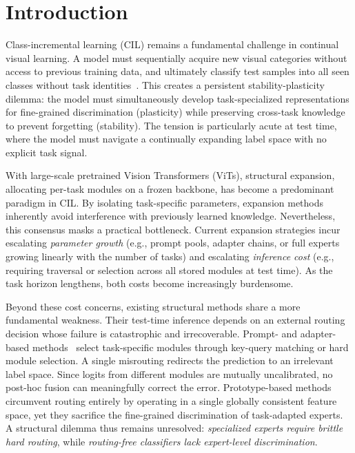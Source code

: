 \section{Introduction}
\label{sec:intro}

Class-incremental learning (CIL) remains a fundamental challenge in continual visual learning. A model must sequentially acquire new visual categories without access to previous training data, and ultimately classify test samples into all seen classes without task identities~\cite{rebuffi2017icarl,van2019three}. This creates a persistent stability-plasticity dilemma: the model must simultaneously develop task-specialized representations for fine-grained discrimination (plasticity) while preserving cross-task knowledge to prevent forgetting (stability). The tension is particularly acute at test time, where the model must navigate a continually expanding label space with no explicit task signal.

With large-scale pretrained Vision Transformers (ViTs), structural expansion, allocating per-task modules on a frozen backbone, has become a predominant paradigm in CIL. By isolating task-specific parameters, expansion methods inherently avoid interference with previously learned knowledge. Nevertheless, this consensus masks a practical bottleneck. Current expansion strategies incur escalating \emph{parameter growth} (e.g., prompt pools, adapter chains, or full experts growing linearly with the number of tasks) and escalating \emph{inference cost} (e.g., requiring traversal or selection across all stored modules at test time). As the task horizon lengthens, both costs become increasingly burdensome.

Beyond these cost concerns, existing structural methods share a more fundamental weakness. Their test-time inference depends on an external routing decision whose failure is catastrophic and irrecoverable. Prompt- and adapter-based methods~\cite{wang2022learning,ease2024,wang2025integrating} select task-specific modules through key-query matching or hard module selection. A single misrouting redirects the prediction to an irrelevant label space. Since logits from different modules are mutually uncalibrated, no post-hoc fusion can meaningfully correct the error. Prototype-based methods~\cite{ranpac2023,fecam2023} circumvent routing entirely by operating in a single globally consistent feature space, yet they sacrifice the fine-grained discrimination of task-adapted experts. A structural dilemma thus remains unresolved: \emph{specialized experts require brittle hard routing}, while \emph{routing-free classifiers lack expert-level discrimination}.

